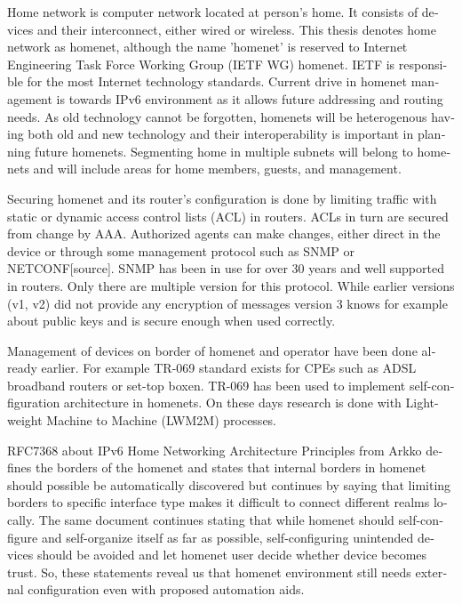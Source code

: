 \documentclass[12pt,a4paper,english]{tutthesis}
\begin{document}
\begin{otherlanguage}{english}
Home network is computer network located at person's home. It consists
of devices and their interconnect, either wired or wireless.  This
thesis denotes home network as homenet, although the name 'homenet'
is reserved to Internet Engineering Task Force Working Group (IETF WG) homenet.
IETF is responsible for the most Internet technology standards.
Current drive in homenet management is towards IPv6 environment
 as it allows future  addressing and routing needs. As old technology
cannot be forgotten, homenets will be heterogenous having both
old and new technology and their interoperability is important in
planning future homenets. Segmenting home in multiple subnets will belong
to homenets and will include areas for home members, guests,
and management.



Securing homenet and its router's configuration is done by limiting
traffic with static or dynamic access control lists (ACL) in
routers. ACLs in turn are secured from change by AAA. Authorized
agents can make changes, either direct in the device or through some
management protocol such as SNMP or NETCONF[source].  SNMP has been in
use for over 30 years and well supported in routers. Only there are
multiple version for this protocol. While earlier versions (v1, v2)
did not provide any encryption of messages version 3 knows for example
about public keys and is secure enough when used correctly.


Management of devices on border of homenet and operator have 
been done already earlier. For example TR-069 standard
exists\cite{iptvtr069} for CPEs such as ADSL broadband routers or
set-top boxen. TR-069 has been used to implement self-configuration
archi\-tecture in
homenets\cite{tr069rachidi2011}.
On these days research is done with Light-weight Machine to Machine
(LWM2M) processes. 


RFC7368 about IPv6 Home Networking Architecture Principles from
Arkko\cite{rfc7368} defines the borders of the homenet and states that
internal borders in homenet should possible be automatically
discovered but continues by saying that limiting borders to specific
interface type makes it difficult to connect different realms locally.
The same document continues stating
that while homenet should self-configure and self-organize itself as
far as possible, self-configuring unintended devices should be
avoided and let homenet user decide whether device becomes trust.
So, these statements reveal us that homenet environment still needs
external configuration even with proposed automation aids.







\end{otherlanguage}
\end{document}
